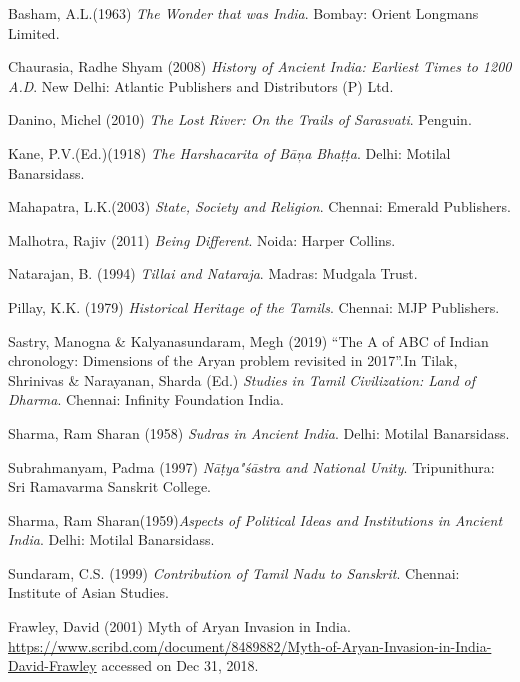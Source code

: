 \begin{thebibliography}{99}
 Basham, A.L.(1963) \textit{The Wonder that was India}. Bombay: Orient Longmans Limited.

  Chaurasia, Radhe Shyam (2008) \textit{History of Ancient India: Earliest Times to 1200 A.D}. New Delhi: Atlantic Publishers and Distributors (P) Ltd.

  Danino, Michel (2010) \textit{The Lost River: On the Trails of Sarasvati}. Penguin.

  Kane, P.V.(Ed.)(1918) \textit{The Harshacarita of Bāņa Bhaṭṭa}. Delhi: Motilal Banarsidass.

  Mahapatra, L.K.(2003) \textit{State, Society and Religion}. Chennai: Emerald Publishers.

  Malhotra, Rajiv (2011) \textit{Being Different}. Noida: Harper Collins.

  Natarajan, B. (1994) \textit{Tillai and Nataraja}. Madras: Mudgala Trust.

  Pillay, K.K. (1979) \textit{Historical Heritage of the Tamils}. Chennai: MJP Publishers.

  Sastry, Manogna \& Kalyanasundaram, Megh (2019) “The A of ABC of Indian chronology: Dimensions of the Aryan problem revisited in 2017”.In Tilak, Shrinivas \& Narayanan, Sharda (Ed.) \textit{Studies in Tamil Civilization: Land of Dharma}. Chennai: Infinity Foundation India.

  Sharma, Ram Sharan (1958) \textit{Sudras in Ancient India}. Delhi: Motilal Banarsidass.

  Subrahmanyam, Padma (1997) \textit{Nāṭya"śāstra and National Unity}. Tripunithura: Sri Ramavarma Sanskrit College.

  Sharma, Ram Sharan(1959)\textit{Aspects of Political Ideas and Institutions in Ancient India}. Delhi: Motilal Banarsidass.

  Sundaram, C.S. (1999) \textit{Contribution of Tamil Nadu to Sanskrit}. Chennai: Institute of Asian Studies.

  Frawley, David (2001) Myth of Aryan Invasion in India. \url{https://www.scribd.com/document/8489882/Myth-of-Aryan-Invasion-in-India-David-Frawley} accessed on Dec 31, 2018.


\end{thebibliography}
